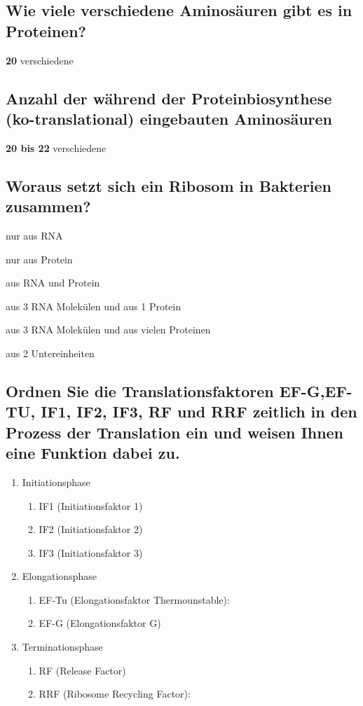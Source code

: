\documentclass{article}
\newcommand{\cmark}{\ding{51}}%
\newcommand{\done}{\rlap{$\square$}{\raisebox{2pt}{\large\hspace{1pt}\cmark}}%
\hspace{-2.5pt}}
\begin{document}
\subsection*{Wie viele verschiedene Aminosäuren gibt es in
Proteinen?}
\textbf{20} verschiedene

\subsection*{Anzahl der während der Proteinbiosynthese (ko-translational) eingebauten Aminosäuren}
\textbf{20 bis 22} verschiedene 

\subsection*{Woraus setzt sich ein Ribosom in Bakterien zusammen?}
\begin{todolist}
\item nur aus RNA 
\item nur aus Protein
\item [\done] aus RNA und Protein
\item [\done] aus 3 RNA Molekülen und aus 1 Protein
\item aus 3 RNA Molekülen und aus vielen Proteinen 
\item [\done] aus 2 Untereinheiten
\end{todolist} 

\subsection*{Ordnen Sie die
Translationsfaktoren EF-G,EF-TU, IF1, IF2, IF3, RF und RRF zeitlich in den Prozess der Translation ein und weisen Ihnen eine Funktion dabei zu. 
}
\begin{enumerate}
    \item Initiationsphase 
    \begin{enumerate}
        \item IF1 (Initiationsfaktor 1)
        \item IF2 (Initiationsfaktor 2)
        \item IF3 (Initiationsfaktor 3)
    \end{enumerate}
    \item Elongationsphase
    \begin{enumerate}
        \item EF-Tu (Elongationsfaktor Thermounstable):
        \item EF-G (Elongationsfaktor G)
    \end{enumerate}
    \item Terminationsphase
    \begin{enumerate}
        \item RF (Release Factor)
        \item RRF (Ribosome Recycling Factor):
    \end{enumerate}
\end{enumerate}
\end{document}
